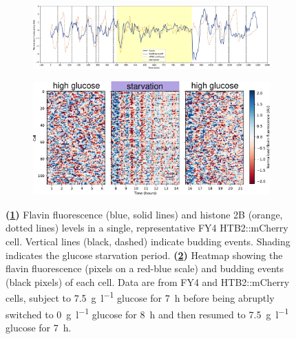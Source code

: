 \begin{figure}
  \centering
  \begin{subfigure}[htpb]{1.0\textwidth}
   \centering
   \includegraphics[width=\textwidth]{starvation_single_birth_plot_new_edit.pdf}
   \caption{
   }
   \label{fig:biology-starvation-single}
  \end{subfigure}

  \begin{subfigure}[htpb]{0.9\textwidth}
   \centering
   \includegraphics[width=\textwidth]{heatmap_012_edit.pdf}
   \caption{
   }
   \label{fig:biology-starvation-heatmap}
  \end{subfigure}

  \caption{
    \textbf{(\ref{fig:biology-starvation-single})}
    Flavin fluorescence (blue, solid lines) and histone 2B (orange, dotted lines) levels in a single, representative FY4 HTB2::mCherry cell.
    Vertical lines (black, dashed) indicate budding events.
    Shading indicates the glucose starvation period.
    \textbf{(\ref{fig:biology-starvation-heatmap})}
    Heatmap showing the flavin fluorescence (pixels on a red-blue scale) and budding events (black pixels) of each cell.
    Data are from FY4 and HTB2::mCherry cells, subject to \SI{7.5}{\gram~\litre^{-1}} glucose for \SI{7}{\hour} before being abruptly switched to \SI{0}{\gram~\litre^{-1}} glucose for \SI{8}{\hour} and then resumed to \SI{7.5}{\gram~\litre^{-1}} glucose for \SI{7}{\hour}.
  }
  \label{fig:biology-starvation}
\end{figure}

